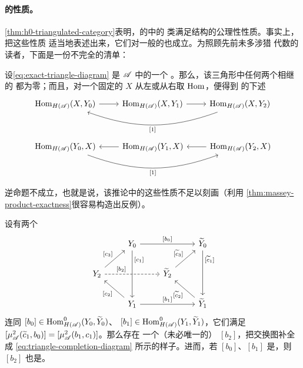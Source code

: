 \paragraph{\trExactTriangle{}的性质。}\label{sub:properties-of-triangles}
\cref{thm:h0-triangulated-category}表明，\trTriangulated{}的\trACategory{}中的%
\trExactTriangle{}类满足\trTriangulated{}结构的公理性性质。事实上，把这些性质
适当地表述出来，它们对一般的\trACategory{}也成立。为照顾先前未多涉猎%
\trHomology{}代数的读者，下面是一份不完全的清单：

\begin{corollary}\label{thm:long-exact-sequence-hom}
设\eqref{eq:exact-triangle-diagram} 是\trACategory{} $\mathscr{A}$ 中的一个%
\trExactTriangle。那么，该三角形中任何两个相继\trMorphism{}的\trComposition{}%
都为零；而且，对一个固定的\trObject{} $X$ 从左或从右取 $\operatorname{Hom}$，便得到%
\trVectorSpace{}的下述\trLongExactSequence
\begin{equation*}
\begin{tikzcd}
\Hom_{H(\scr{A})}(X,Y_0) \ar[r] & \Hom_{H(\scr{A})}(X,Y_1) \ar[r] &
\Hom_{H(\scr{A})}(X,Y_2) \ar[ll,bend left=20,"{[1]}"]
\end{tikzcd}
\end{equation*}
\begin{equation*}
\begin{tikzcd}
\Hom_{H(\scr{A})}(Y_0,X) \ar[rr,bend right=20,"{[1]}"'] &
\Hom_{H(\scr{A})}(Y_1,X) \ar[l] & \Hom_{H(\scr{A})}(Y_2,X) \ar[l]
\end{tikzcd}
\end{equation*}
\end{corollary}

逆命题不成立，也就是说，该推论中的这些性质不足以刻画\trExactTriangle（利用%
\cref{thm:massey-product-exactness}很容易构造出反例）。

\begin{corollary}\label{thm:triangle-completion}
设有两个\trExactTriangle
\begin{equation}\label{eq:triangle-completion-diagram}
\begin{tikzcd}
& Y_0 \ar[rr,"{[b_0]}"] \ar[dd,"{[c_1]}"{pos=0.2}] && \widetilde{Y}_0
\ar[dd,"{[\widetilde{c}_1]}"{pos=0.2}] \\
Y_2 \ar[ur,"{[c_3]}"] \ar[rr,"{[b_2]}"{pos=0.3},dashed] && \widetilde{Y}_2
\ar[ur,"{[\widetilde{c}_3]}"] \\
& Y_1 \ar[rr,"{[b_1]}"] \ar[ul,"{[c_2]}"] && \widetilde{Y}_1
\ar[ul,"{[\widetilde{c}_2]}"]
\end{tikzcd}
\end{equation}
连同\trMorphism{} $[b_0]\in\operatorname{Hom}^0_{H(\mathscr{A})}(Y_0,\widetilde{Y}_0)$、
$[b_1]\in\operatorname{Hom}^0_{H(\mathscr{A})}(Y_1,\widetilde{Y}_1)$，它们满足
$[\mu^2_{\mathscr{A}}(\widetilde{c}_1,b_0)]=[\mu^2_{\mathscr{A}}(b_1,c_1)]$。那么存在
一个（未必唯一的）\trMorphism{} $[b_2]$，把交换图补全成
\eqref{eq:triangle-completion-diagram} 所示的样子。进而，若 $[b_0]$、$[b_1]$
是\trIsomorphism，则 $[b_2]$ 也是。
\end{corollary}

